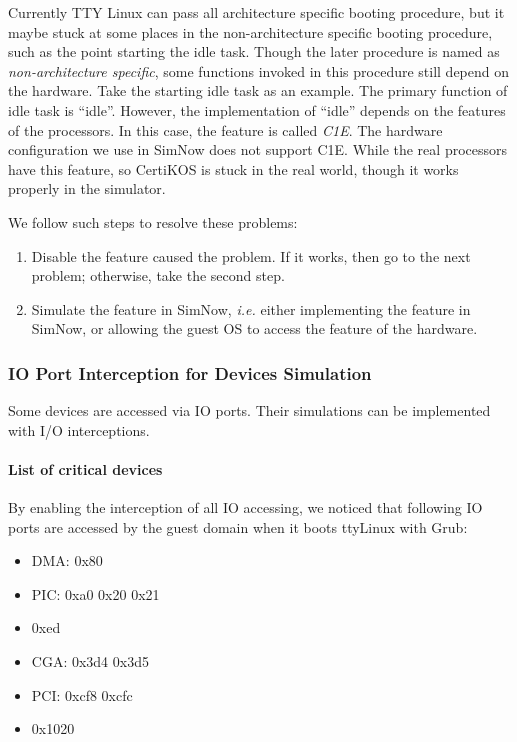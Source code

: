 \documentclass[a4paper,12pt]{article}
\begin{document}
Currently TTY Linux can pass all architecture specific booting procedure, but it maybe stuck at some places in the non-architecture specific booting procedure, such as the point starting the idle task. Though the later procedure is named as {\it non-architecture specific}, some functions invoked in this procedure still depend on the hardware. Take the starting idle task as an example. The primary function of idle task is ``idle''. However, the implementation of ``idle'' depends on the features of the processors. In this case, the feature is called {\it C1E}. The hardware configuration we use in SimNow does not support C1E. While the real processors have this feature, so CertiKOS is stuck in the real world, though it works properly in the simulator.

We follow such steps to resolve these problems:
\begin{enumerate}
\item Disable the feature caused the problem. If it works, then go to the next problem; otherwise, take the second step.
\item Simulate the feature in SimNow, {\it i.e.} either implementing the feature in SimNow, or allowing the guest OS to access the feature of the hardware.
\end{enumerate}


\subsubsection{IO Port Interception for Devices Simulation}
Some devices are accessed via IO ports. Their simulations can be implemented with I/O interceptions.


\paragraph{List of critical devices}
By enabling the interception of all IO accessing,  we noticed that following IO ports are accessed by the guest domain when it boots ttyLinux with Grub:
\begin{itemize}
\item DMA: 0x80
\item PIC: 0xa0 0x20 0x21
\item 0xed

\item CGA: 0x3d4 0x3d5
\item PCI:  0xcf8 0xcfc
\item 0x1020
\end{itemize}
\end{document}
